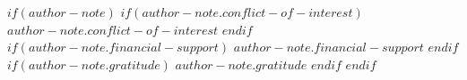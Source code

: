 $if(author-note)$
$if(author-note.conflict-of-interest)$
$author-note.conflict-of-interest$
$endif$
$if(author-note.financial-support)$
$author-note.financial-support$
$endif$
$if(author-note.gratitude)$
$author-note.gratitude$
$endif$
$endif$
